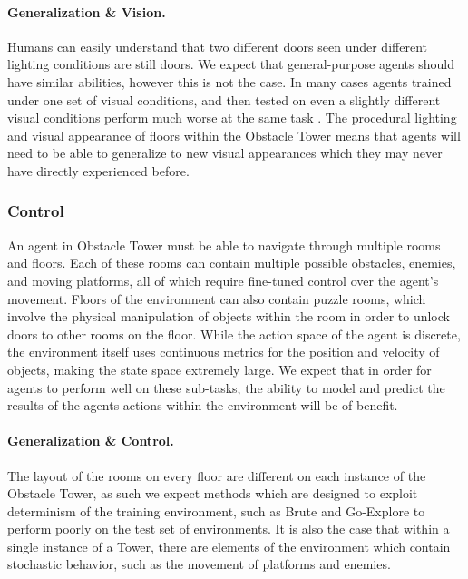 \documentclass{article}
\begin{document}
\paragraph{Generalization \& Vision.} Humans can easily understand that two different doors seen under different lighting conditions are still doors. We expect that general-purpose agents should have similar abilities, however this is not the case. In many cases agents trained under one set of visual conditions, and then tested on even a slightly different visual conditions perform much worse at the same task \cite{huang2017adversarial}. The procedural lighting and visual appearance of floors within the Obstacle Tower means that agents will need to be able to generalize to new visual appearances which they may never have directly experienced before. 

\subsubsection{Control} An agent in Obstacle Tower must be able to navigate through multiple rooms and floors. Each of these rooms can contain multiple possible obstacles, enemies, and moving platforms, all of which require fine-tuned control over the agent's movement. Floors of the environment can also contain puzzle rooms, which involve the physical manipulation of objects within the room in order to unlock doors to other rooms on the floor. While the action space of the agent is discrete, the environment itself uses continuous metrics for the position and velocity of objects, making the state space extremely large. We expect that in order for agents to perform well on these sub-tasks, the ability to model and predict the results of the agents actions within the environment will be of benefit.

\paragraph{Generalization \& Control.} The layout of the rooms on every floor are different on each instance of the Obstacle Tower, as such we expect methods which are designed to exploit determinism of the training environment, such as Brute \cite{machado2017revisiting} and Go-Explore \cite{clune2018} to perform poorly on the test set of environments. It is also the case that within a single instance of a Tower, there are elements of the environment which contain stochastic behavior, such as the movement of platforms and enemies. 
\end{document}
